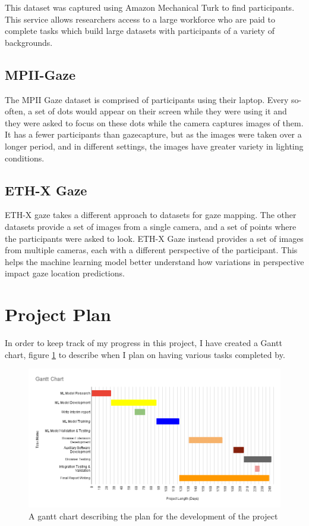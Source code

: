 \documentclass[twocolumn]{report}
\begin{document}
This dataset was captured using Amazon Mechanical Turk \cite{mturk} to find participants. This service allows researchers access to a large workforce who are paid to complete tasks which build large datasets with participants of a variety of backgrounds. 

\subsection{MPII-Gaze}

The MPII Gaze dataset is comprised of participants using their laptop. Every so-often, a set of dots would appear on their screen while they were using it and they were asked to focus on these dots while the camera captures images of them. It has a fewer participants than gazecapture, but as the images were taken over a longer period, and in different settings, the images have greater variety in lighting conditions.  

\subsection{ETH-X Gaze}

ETH-X gaze takes a different approach to datasets for gaze mapping. The other datasets provide a set of images from a single camera, and a set of points where the participants were asked to look. ETH-X Gaze instead provides a set of images from multiple cameras, each with a different perspective of the participant. This helps the machine learning model better understand how variations in perspective impact gaze location predictions. 

\section{Project Plan}

In order to keep track of my progress in this project, I have created a Gantt chart, figure \ref{fig:gantt-chart}  to describe when I plan on having various tasks completed by. 
\begin{figure}[h]
    \begin{center}
        \includegraphics[scale=0.5]{../assets/project-plan-gantt-chart.png}
    \end{center} 
    \caption{A gantt chart describing the plan for the development of the project}
    \label{fig:gantt-chart}
\end{figure}
\end{document}
